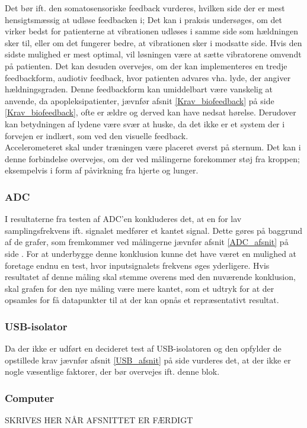 Det bør ift. den somatosensoriske feedback vurderes, hvilken side der er mest hensigtsmæssig at udløse feedbacken i; Det kan i praksis undersøges, om det virker bedst for patienterne at vibrationen udløses i samme side som hældningen sker til, eller om det fungerer bedre, at vibrationen sker i modsatte side. Hvis den sidste mulighed er mest optimal, vil løsningen være at sætte vibratorene omvendt på patienten. 
Det kan desuden overvejes, om der kan implementeres en tredje feedbackform, audiotiv feedback, hvor patienten advares vha. lyde, der angiver hældningsgraden. Denne feedbackform kan umiddelbart være vanskelig at anvende, da apopleksipatienter, jævnfør afsnit \ref{Krav_biofeedback} på side \ref{Krav_biofeedback}, ofte er ældre og derved kan have nedsat hørelse. Derudover kan betydningen af lydene være svær at huske, da det ikke er et system der i forvejen er indlært, som ved den visuelle feedback. \\
Accelerometeret skal under træningen være placeret øverst på sternum. Det kan i denne forbindelse overvejes, om der ved målingerne forekommer støj fra kroppen; eksempelvis i form af påvirkning fra hjerte og lunger.


\subsubsection{ADC}
I resultaterne fra testen af ADC'en konkluderes det, at en for lav samplingsfrekvens ift. signalet medfører et kantet signal. Dette gøres på baggrund af de grafer, som fremkommer ved målingerne jævnfør afsnit \ref{ADC_afsnit} på side \pageref{ADC_afsnit}. For at underbygge denne konklusion kunne det have været en mulighed at foretage endnu en test, hvor inputsignalets frekvens øges yderligere. Hvis resultatet af denne måling skal stemme overens med den nuværende konklusion, skal grafen for den nye måling være mere kantet, som et udtryk for at der opsamles for få datapunkter til at der kan opnås et repræsentativt resultat.

\subsubsection{USB-isolator}
Da der ikke er udført en decideret test af USB-isolatoren og den opfylder de opstillede krav jævnfør afsnit \ref{USB_afsnit} på side \pageref{USB_afsnit} vurderes det, at der ikke er nogle væsentlige faktorer, der bør overvejes ift. denne blok.

\subsubsection{Computer}
SKRIVES HER NÅR AFSNITTET ER FÆRDIGT

